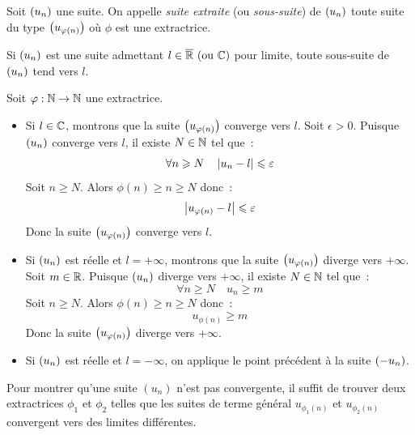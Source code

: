 \documentclass{magnoliaold}
\begin{document}
\begin{definition}[utile=-3]
Soit $\left(u_n\right)$ une suite. On appelle \emph{suite extraite} (ou \emph{sous-suite}) de
$\left(u_n\right)$ toute suite du type $\left(u_{\varphi(n)}\right)$ où $\phi$ est une extractrice.
\end{definition}

\begin{proposition}[utile=-3]
Si $\left(u_n\right)$ est une suite admettant $l\in\text{$\overline{\mathbb{R}}$ (ou $\mathbb{C}$)}$
pour limite, toute sous-suite de $\left(u_n\right)$ tend vers $l$. 
\end{proposition}



\begin{preuve}
Soit $\varphi:\mathbb{N}\to\mathbb{N}$ une extractrice.
\begin{itemize}
\item Si $l\in\mathbb{C}$, montrons que la suite $\left(u_{\varphi(n)}\right)$ converge vers $l$.
  Soit $\epsilon>0$. Puisque $\left(u_n\right)$ converge vers $l$, il existe $N\in\mathbb{N}$
  tel que~:
  \[\forall n\geqslant N \quad \left|u_n-l\right|\leqslant\varepsilon\]
  Soit $n\geq N$. Alors $\phi(n)\geq n\geq N$ donc~:
  \[\left|u_{\varphi(n)}-l\right|\leqslant\varepsilon\]
  Donc la suite $\left(u_{\varphi(n)}\right)$ converge vers $l$.
\item Si $\left(u_n\right)$ est réelle et $l=+\infty$, montrons que la suite
  $\left(u_{\varphi(n)}\right)$ diverge vers $+\infty$. Soit $m\in\mathbb{R}$. Puisque $\left(u_n\right)$
  diverge vers $+\infty$, il existe $N\in\mathbb{N}$ tel que~:
  \[\forall n\geq N \quad u_n\geq m\]
  Soit $n\geq N$. Alors $\phi(n)\geq n\geq N$ donc~:
  \[u_{\phi(n)}\geq m\]
  Donc la suite $\left(u_{\varphi(n)}\right)$ diverge vers $+\infty$.
\item Si $\left(u_n\right)$ est réelle et $l=-\infty$, on applique le point précédent
  à la suite $\left(-u_n\right)$.
\end{itemize}
\end{preuve}

\begin{remarqueUnique}
\remarque Pour montrer qu'une suite $(u_n)$ n'est pas convergente, il suffit
  de trouver deux extractrices $\phi_1$ et $\phi_2$ telles que les suites de
  terme général $u_{\phi_1(n)}$ et $u_{\phi_2(n)}$ convergent vers des limites
  différentes.
\end{remarqueUnique}
\end{document}
